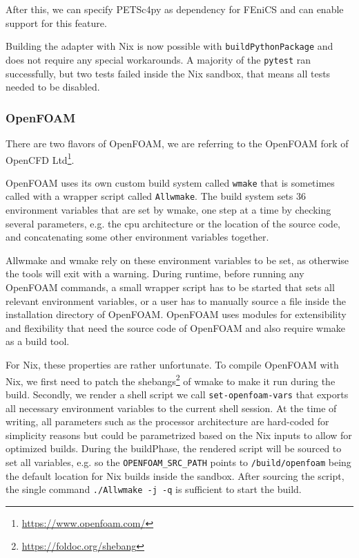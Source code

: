 \documentclass{eceasst}
\begin{document}
After this, we can specify PETSc4py as dependency for FEniCS and can enable support for this feature.

Building the adapter with Nix is now possible with \texttt{buildPythonPackage} and does not require any special workarounds.
A majority of the \texttt{pytest} ran successfully, but two tests failed inside the Nix sandbox, that means all tests needed to be disabled.\\

\subsubsection{OpenFOAM}

There are two flavors of OpenFOAM, we are referring to the OpenFOAM fork of OpenCFD Ltd\footnote{\url{https://www.openfoam.com/}}.

OpenFOAM uses its own custom build system called \texttt{wmake} that is sometimes called with a wrapper script called \texttt{Allwmake}.
The build system sets 36 environment variables that are set by wmake, one step at a time by checking several parameters, e.g. the cpu architecture or the location of the source code, and concatenating some other environment variables together.

Allwmake and wmake rely on these environment variables to be set, as otherwise the tools will exit with a warning.
During runtime, before running any OpenFOAM commands, a small wrapper script has to be started that sets all relevant environment variables, or a user has to manually source a file inside the installation directory of OpenFOAM.
OpenFOAM uses modules for extensibility and flexibility that need the source code of OpenFOAM and also require wmake as a build tool.

For Nix, these properties are rather unfortunate.
To compile OpenFOAM with Nix, we first need to patch the shebangs\footnote{\url{https://foldoc.org/shebang}} of wmake to make it run during the build.
Secondly, we render a shell script we call \texttt{set-openfoam-vars} that exports all necessary environment variables to the current shell session.
At the time of writing, all parameters such as the processor architecture are hard-coded for simplicity reasons but could be parametrized based on the Nix inputs to allow for optimized builds.
During the buildPhase, the rendered script will be sourced to set all variables, e.g. so the \texttt{OPENFOAM\_SRC\_PATH} points to \texttt{/build/openfoam} being the default location for Nix builds inside the sandbox.
After sourcing the script, the single command \texttt{./Allwmake -j -q} is sufficient to start the build.
\end{document}
